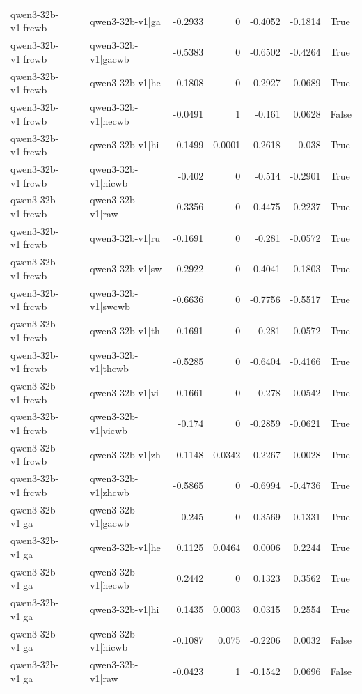 \begin{table}
\begin{tabular}{l l r r r r l}
qwen3-32b-v1|frcwb & qwen3-32b-v1|ga & -0.2933 & 0 & -0.4052 & -0.1814 & True \\
qwen3-32b-v1|frcwb & qwen3-32b-v1|gacwb & -0.5383 & 0 & -0.6502 & -0.4264 & True \\
qwen3-32b-v1|frcwb & qwen3-32b-v1|he & -0.1808 & 0 & -0.2927 & -0.0689 & True \\
qwen3-32b-v1|frcwb & qwen3-32b-v1|hecwb & -0.0491 & 1 & -0.161 & 0.0628 & False \\
qwen3-32b-v1|frcwb & qwen3-32b-v1|hi & -0.1499 & 0.0001 & -0.2618 & -0.038 & True \\
qwen3-32b-v1|frcwb & qwen3-32b-v1|hicwb & -0.402 & 0 & -0.514 & -0.2901 & True \\
qwen3-32b-v1|frcwb & qwen3-32b-v1|raw & -0.3356 & 0 & -0.4475 & -0.2237 & True \\
qwen3-32b-v1|frcwb & qwen3-32b-v1|ru & -0.1691 & 0 & -0.281 & -0.0572 & True \\
qwen3-32b-v1|frcwb & qwen3-32b-v1|sw & -0.2922 & 0 & -0.4041 & -0.1803 & True \\
qwen3-32b-v1|frcwb & qwen3-32b-v1|swcwb & -0.6636 & 0 & -0.7756 & -0.5517 & True \\
qwen3-32b-v1|frcwb & qwen3-32b-v1|th & -0.1691 & 0 & -0.281 & -0.0572 & True \\
qwen3-32b-v1|frcwb & qwen3-32b-v1|thcwb & -0.5285 & 0 & -0.6404 & -0.4166 & True \\
qwen3-32b-v1|frcwb & qwen3-32b-v1|vi & -0.1661 & 0 & -0.278 & -0.0542 & True \\
qwen3-32b-v1|frcwb & qwen3-32b-v1|vicwb & -0.174 & 0 & -0.2859 & -0.0621 & True \\
qwen3-32b-v1|frcwb & qwen3-32b-v1|zh & -0.1148 & 0.0342 & -0.2267 & -0.0028 & True \\
qwen3-32b-v1|frcwb & qwen3-32b-v1|zhcwb & -0.5865 & 0 & -0.6994 & -0.4736 & True \\
qwen3-32b-v1|ga & qwen3-32b-v1|gacwb & -0.245 & 0 & -0.3569 & -0.1331 & True \\
qwen3-32b-v1|ga & qwen3-32b-v1|he & 0.1125 & 0.0464 & 0.0006 & 0.2244 & True \\
qwen3-32b-v1|ga & qwen3-32b-v1|hecwb & 0.2442 & 0 & 0.1323 & 0.3562 & True \\
qwen3-32b-v1|ga & qwen3-32b-v1|hi & 0.1435 & 0.0003 & 0.0315 & 0.2554 & True \\
qwen3-32b-v1|ga & qwen3-32b-v1|hicwb & -0.1087 & 0.075 & -0.2206 & 0.0032 & False \\
qwen3-32b-v1|ga & qwen3-32b-v1|raw & -0.0423 & 1 & -0.1542 & 0.0696 & False \\

\end{tabular}
\end{table}
